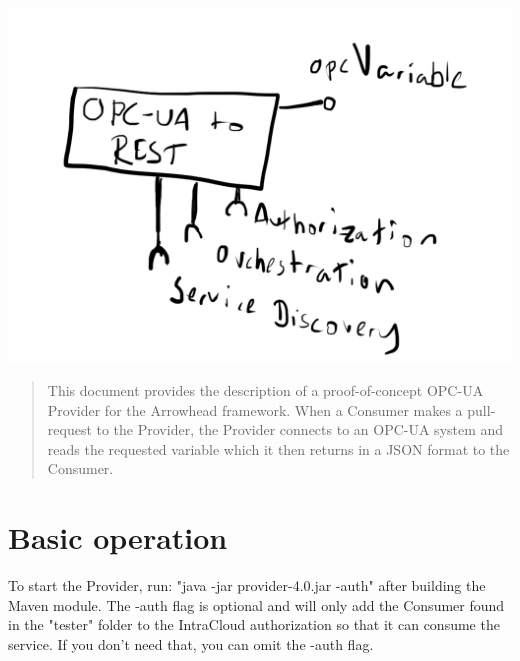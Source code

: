 \documentclass[a4paper]{arrowhead}
\begin{document}
\ArrowheadDate{\today}
\ArrowheadSetup

\begin{center}
  \vspace*{1cm}
  \LARGE{\arrowtitle}
  \vspace*{1cm}
  \vspace*{\fill}

  \includegraphics[scale=1.5]{fig/OPC-2-REST_SysD.png}

  \vspace*{1cm}
  \vspace*{\fill}

  \begin{abstract}
    This document provides the description of a proof-of-concept OPC-UA Provider for the Arrowhead framework. When a Consumer makes a pull-request to the Provider, the Provider connects to an OPC-UA system and reads the requested variable which it then returns in a JSON format to the Consumer.
  \end{abstract}
\end{center}

\newpage

\section{Basic operation}
To start the Provider, run: "java -jar provider-4.0.jar -auth" after building the Maven module. The -auth flag is optional and will only add the Consumer found in the "tester" folder to the IntraCloud authorization so that it can consume the service. If you don't need that, you can omit the -auth flag.
\newline
\end{document}
